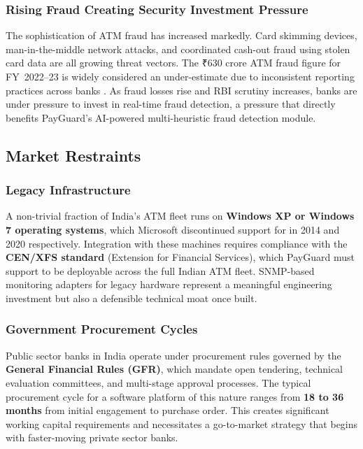 \documentclass[12pt,a4paper]{article}
\newcommand{\inr}{₹}
\begin{document}
\subsubsection{Rising Fraud Creating Security Investment Pressure}

The sophistication of ATM fraud has increased markedly. Card skimming devices, man-in-the-middle
network attacks, and coordinated cash-out fraud using stolen card data are all growing threat
vectors. The \inr{}630 crore ATM fraud figure for FY~2022--23 is widely considered an
under-estimate due to inconsistent reporting practices across banks \citep{rbi2023fraud}. As fraud
losses rise and RBI scrutiny increases, banks are under pressure to invest in real-time fraud
detection, a pressure that directly benefits PayGuard's AI-powered multi-heuristic fraud detection
module.

\subsection{Market Restraints}

\subsubsection{Legacy Infrastructure}

A non-trivial fraction of India's ATM fleet runs on \textbf{Windows XP or Windows 7 operating
systems}, which Microsoft discontinued support for in 2014 and 2020 respectively. Integration
with these machines requires compliance with the \textbf{CEN/XFS standard} \citep{xfs2023}
(Extension for Financial Services), which PayGuard must support to be deployable across the full
Indian ATM fleet. SNMP-based monitoring adapters for legacy hardware represent a meaningful
engineering investment but also a defensible technical moat once built.

\subsubsection{Government Procurement Cycles}

Public sector banks in India operate under procurement rules governed by the \textbf{General
Financial Rules (GFR)}, which mandate open tendering, technical evaluation committees, and
multi-stage approval processes. The typical procurement cycle for a software platform of this
nature ranges from \textbf{18 to 36 months} from initial engagement to purchase order. This
creates significant working capital requirements and necessitates a go-to-market strategy that
begins with faster-moving private sector banks.
\end{document}
